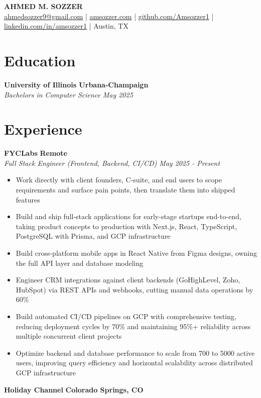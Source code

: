 \documentclass[10pt,letterpaper]{article}
\begin{document}
\begin{center}
  \textbf{\Large AHMED M. SOZZER}\\
  \smallskip
   \href{mailto:ahmedsozzer9@gmail.com}{ahmedsozzer9@gmail.com} | \href{http://amsozzer.com}{amsozzer.com} | \href{http://github.com/Amsozzer1}{github.com/Amsozzer1} | \href{http://linkedin.com/in/amsozzer1}{linkedin.com/in/amsozzer1} | Austin, TX
\end{center}
\section*{Education}
\noindent\textbf{University of Illinois Urbana-Champaign}\\
\textit{Bachelors in Computer Science} \hfill \textit{May 2025}
\section*{Experience}
\noindent\textbf{FYCLabs} \hfill \textbf{Remote}\\
\textit{Full Stack Engineer (Frontend, Backend, CI/CD)} \hfill \textit{May 2025 - Present}
\begin{itemize}
  \item Work directly with client founders, C-suite, and end users to scope requirements and surface pain points, then translate them into shipped features
  \item Build and ship full-stack applications for early-stage startups end-to-end, taking product concepts to production with Next.js, React, TypeScript, PostgreSQL with Prisma, and GCP infrastructure
  \item Build cross-platform mobile apps in React Native from Figma designs, owning the full API layer and database modeling
  \item Engineer CRM integrations against client backends (GoHighLevel, Zoho, HubSpot) via REST APIs and webhooks, cutting manual data operations by 60\%
  \item Build automated CI/CD pipelines on GCP with comprehensive testing, reducing deployment cycles by 70\% and maintaining 95\%+ reliability across multiple concurrent client projects
  \item Optimize backend and database performance to scale from 700 to 5000 active users, improving query efficiency and horizontal scalability across distributed GCP infrastructure
\end{itemize}
\vspace{0.2em}
\noindent\textbf{Holiday Channel} \hfill \textbf{Colorado Springs, CO}\\
\end{document}
